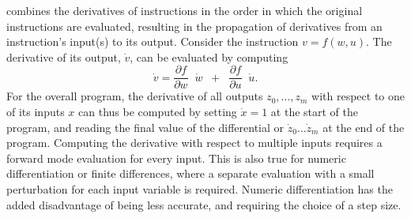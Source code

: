 { combines the derivatives of instructions in the order in which the original instructions are evaluated, resulting in the propagation of derivatives from an instruction's input(s) to its output. Consider the instruction $v = f(w,u)$. The derivative of its output, $\dot{v}$, can be evaluated by computing $$\dot{v}=\frac{\partial f}{\partial w}\;\;\dot{w}{\;\;+\;\;\frac{\partial f}{\partial u}\;\;\dot{u}}.$$ For the overall program, the derivative of all outputs $z_0,\ldots,z_m$ with respect to one of its inputs $x$ can thus be computed by setting $\dot{x}=1$ at the start of the program, and reading the final value of the differential or  $\dot{z}_0\ldots\dot{z}_m$ at the end of the program. Computing the derivative with respect to multiple inputs requires a forward mode evaluation for every input. This is also true for numeric differentiation or finite differences, where a separate evaluation with a small perturbation for each input variable is required. Numeric differentiation has the added disadvantage of being less accurate, and requiring the choice of a step size.

}
